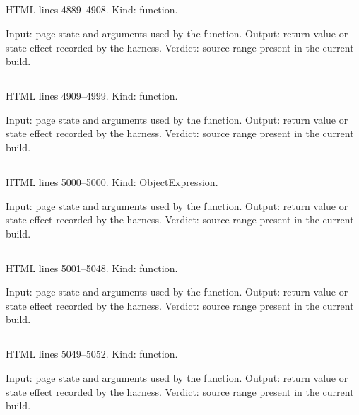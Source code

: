 \subsection*{\texttt{}}
\label{vf_212_sopProcedureHTML}
HTML lines 4889--4908. Kind: function.

Input: page state and arguments used by the function.
Output: return value or state effect recorded by the harness.
Verdict: source range present in the current build.

\subsection*{\texttt{}}
\label{vf_213_renderSopEditor}
HTML lines 4909--4999. Kind: function.

Input: page state and arguments used by the function.
Output: return value or state effect recorded by the harness.
Verdict: source range present in the current build.

\subsection*{\texttt{}}
\label{vf_214_SOP_VIEW}
HTML lines 5000--5000. Kind: ObjectExpression.

Input: page state and arguments used by the function.
Output: return value or state effect recorded by the harness.
Verdict: source range present in the current build.

\subsection*{\texttt{}}
\label{vf_215_renderSopResults}
HTML lines 5001--5048. Kind: function.

Input: page state and arguments used by the function.
Output: return value or state effect recorded by the harness.
Verdict: source range present in the current build.

\subsection*{\texttt{}}
\label{vf_216_sopCurrentRows}
HTML lines 5049--5052. Kind: function.

Input: page state and arguments used by the function.
Output: return value or state effect recorded by the harness.
Verdict: source range present in the current build.

